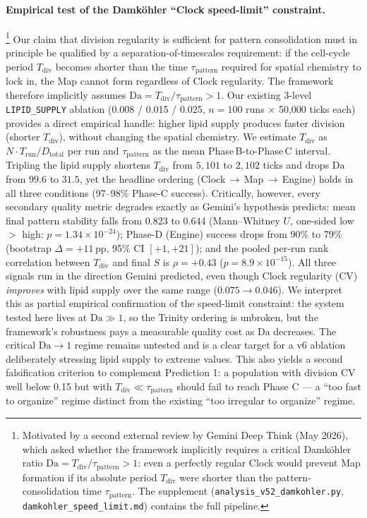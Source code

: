 \documentclass[11pt,letterpaper]{article}
\begin{document}
\paragraph{Empirical test of the Damk\"ohler ``Clock speed-limit'' constraint.}\footnote{Motivated by a second external review by Gemini Deep Think (May 2026), which asked whether the framework implicitly requires a critical Damk\"ohler ratio $\mathrm{Da} = T_{\mathrm{div}} / \tau_{\mathrm{pattern}} > 1$: even a perfectly regular Clock would prevent Map formation if its absolute period $T_{\mathrm{div}}$ were shorter than the pattern-consolidation time $\tau_{\mathrm{pattern}}$. The supplement (\texttt{analysis\_v52\_damkohler.py}, \texttt{damkohler\_speed\_limit.md}) contains the full pipeline.} Our claim that division regularity is sufficient for pattern consolidation must in principle be qualified by a separation-of-timescales requirement: if the cell-cycle period $T_{\mathrm{div}}$ becomes shorter than the time $\tau_{\mathrm{pattern}}$ required for spatial chemistry to lock in, the Map cannot form regardless of Clock regularity. The framework therefore implicitly assumes $\mathrm{Da} = T_{\mathrm{div}} / \tau_{\mathrm{pattern}} > 1$. Our existing 3-level \texttt{LIPID\_SUPPLY} ablation (0.008 / 0.015 / 0.025, $n = 100$ runs $\times$ 50{,}000 ticks each) provides a direct empirical handle: higher lipid supply produces faster division (shorter $T_{\mathrm{div}}$), without changing the spatial chemistry. We estimate $T_{\mathrm{div}}$ as $N \cdot T_{\mathrm{run}} / D_{\mathrm{total}}$ per run and $\tau_{\mathrm{pattern}}$ as the mean Phase\,B-to-Phase\,C interval. Tripling the lipid supply shortens $T_{\mathrm{div}}$ from $5{,}101$ to $2{,}102$ ticks and drops $\mathrm{Da}$ from $99.6$ to $31.5$, yet the headline ordering (Clock\,$\to$\,Map\,$\to$\,Engine) holds in all three conditions (97–98\% Phase-C success). Critically, however, every secondary quality metric degrades exactly as Gemini's hypothesis predicts: mean final pattern stability falls from $0.823$ to $0.644$ (Mann--Whitney $U$, one-sided low $>$ high: $p = 1.34 \times 10^{-24}$); Phase-D (Engine) success drops from 90\% to 79\% (bootstrap $\Delta = +11$\,pp, 95\% CI $[+1, +21]$); and the pooled per-run rank correlation between $T_{\mathrm{div}}$ and final $S$ is $\rho = +0.43$ ($p = 8.9 \times 10^{-15}$). All three signals run in the direction Gemini predicted, even though Clock regularity (CV) \emph{improves} with lipid supply over the same range ($0.075 \to 0.046$). We interpret this as partial empirical confirmation of the speed-limit constraint: the system tested here lives at $\mathrm{Da} \gg 1$, so the Trinity ordering is unbroken, but the framework's robustness pays a measurable quality cost as $\mathrm{Da}$ decreases. The critical $\mathrm{Da} \to 1$ regime remains untested and is a clear target for a v6 ablation deliberately stressing lipid supply to extreme values. This also yields a second falsification criterion to complement Prediction 1: a population with division CV well below 0.15 but with $T_{\mathrm{div}} \ll \tau_{\mathrm{pattern}}$ should fail to reach Phase C --- a ``too fast to organize'' regime distinct from the existing ``too irregular to organize'' regime.
\end{document}
